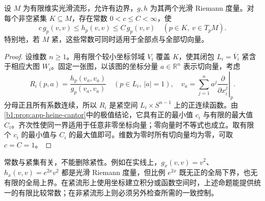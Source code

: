 \begin{proposition}\label{b1:prop:E-metric-equivalence}
设 \(M\) 为有限维实光滑流形，允许有边界，\(g,h\) 为其两个光滑 Riemann 度量。对每个非空紧集 \(K\subseteq M\)，存在常数 \(0<c\leq C<\infty\)，使
\[
 c\,g_p(v,v)\leq h_p(v,v)\leq C\,g_p(v,v)
 \quad(p\in K,\ v\in T_pM).
\]
特别地，若 \(M\) 紧，这些常数可同时适用于全部点与全部切向量。
\end{proposition}
\begin{proof}
设维数 \(n\geq1\)。用有限个较小坐标邻域 \(V_i\) 覆盖 \(K\)，使其闭包 \(L_i=\overline V_i\) 紧含于相应大图 \(W_i\)。固定一张图，以该图的坐标分量 \(a\in\mathbb R^n\) 表示切向量，考虑
\[
 R_i(p,a)=\frac{h_p(v_a,v_a)}{g_p(v_a,v_a)}
 \quad(p\in L_i,\ |a|=1),
 \quad
 v_a=\sum_{j=1}^na^j\left.\frac{\partial}{\partial x_i^j}\right|_p.
\]
分母正且所有系数连续，所以 \(R_i\) 是紧空间 \(L_i\times S^{n-1}\) 上的正连续函数。由\cref{b1:prop:app-heine-cantor}中的极值结论，它具有正的最小值 \(c_i\) 与有限的最大值 \(C_i\)。齐次性使同一界适用于任意非零坐标向量；零向量时不等式也成立。取有限个 \(c_i\) 的最小值与 \(C_i\) 的最大值即可。维数为零时所有切向量均为零，可取 \(c=C=1\)。
\end{proof}

常数与紧集有关，不能删除紧性。例如在实线上，\(g_x(v,v)=v^2\)、\(h_x(v,v)=e^{2x}v^2\) 都是光滑 Riemann 度量，但比例 \(e^{2x}\) 既无正的全局下界，也无有限的全局上界。在紧流形上使用坐标建立积分或函数空间时，上述命题能提供统一的有限比较常数；在非紧流形上则必须另外检查所需的一致控制。
